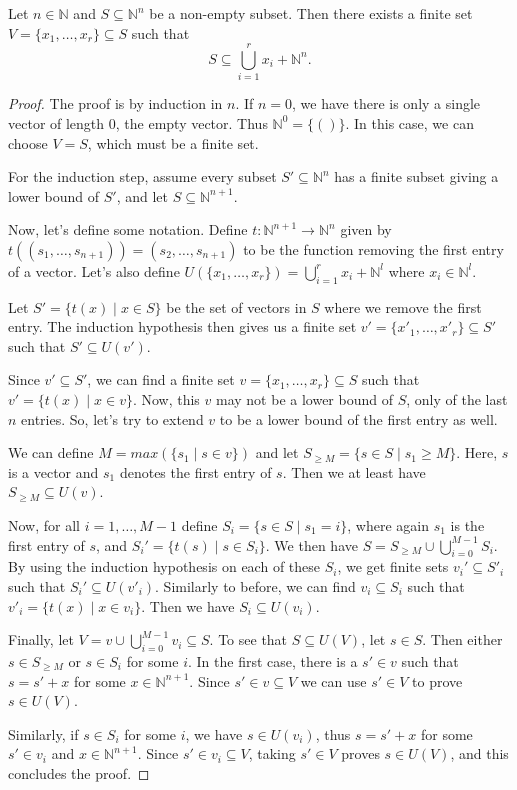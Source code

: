 \documentclass[a4paper, 12pt]{article}
\newcommand{\N}{\mathbb{N}}
\theoremstyle{changedot}
\theoremstyle{changedotbreak}
\theoremstyle{nonumberplain}
\newtheorem{proof}{Proof}
\begin{document}
\begin{lemma}\label{lem:dickson}
Let $n \in \N$ and $S \subseteq \N^{n}$ be a non-empty subset. Then there exists a finite set $V = \{x_{1}, \dots, x_{r}\} \subseteq S$ such that \[S \subseteq \bigcup_{i=1}^{r} x_{i} + \N^{n}.\]
\end{lemma}
\begin{proof}
  The proof is by induction in $n$. If $n = 0$, we have there is only a single vector of length 0, the empty vector. Thus $\N^{0} = \{()\}$. In this case, we can choose $V = S$, which must be a finite set.

  For the induction step, assume every subset $S' \subseteq \N^{n}$ has a finite subset giving a lower bound of $S'$, and let $S \subseteq \N^{n+1}$.

  Now, let's define some notation. Define $t : \N^{n+1} \to \N^{n}$ given by $t((s_{1}, \dots, s_{n+1})) = (s_{2}, \dots, s_{n+1})$ to be the function removing the first entry of a vector. Let's also define $U(\{x_{1}, \dots, x_{r}\}) = \bigcup_{i=1}^{r} x_{i} + \N^{l}$ where $x_{i} \in \N^{l}$.

  Let $S' = \{t(x) \mid x \in S\}$ be the set of vectors in $S$ where we remove the first entry. The induction hypothesis then gives us a finite set $v' = \{x'_{1}, \dots, x'_{r}\} \subseteq S'$ such that $S' \subseteq U(v')$.

  Since $v' \subseteq S'$, we can find a finite set $v = \{x_{1}, \dots, x_{r}\} \subseteq S$ such that $v' = \{t(x) \mid x \in v\}$. Now, this $v$ may not be a lower bound of $S$, only of the last $n$ entries. So, let's try to extend $v$ to be a lower bound of the first entry as well.

  We can define $M = max(\{s_{1} \mid s \in v\})$ and let $S_{\ge M} = \{s \in S \mid s_{1} \ge M\}$. Here, $s$ is a vector and $s_{1}$ denotes the first entry of $s$. Then we at least have $S_{\ge M} \subseteq U(v)$.

  Now, for all $i = 1, \dots, M-1$ define $S_{i} = \{s \in S \mid s_{1} = i\}$, where again $s_{1}$ is the first entry of $s$, and $S_{i}' = \{t(s) \mid s \in S_{i}\}$. We then have $S = S_{\ge M} \cup \bigcup_{i=0}^{M-1} S_{i}$. By using the induction hypothesis on each of these $S_{i}$, we get finite sets $v_{i}' \subseteq S'_{i}$ such that $S_{i}' \subseteq U(v'_{i})$. Similarly to before, we can find $v_{i} \subseteq S_{i}$ such that $v'_{i} = \{t(x) \mid x \in v_{i}\}$. Then we have $S_{i} \subseteq U(v_{i})$.

  Finally, let $V = v \cup \bigcup_{i=0}^{M-1}v_{i} \subseteq S$. To see that $S \subseteq U(V)$, let $s \in S$. Then either $s \in S_{\ge M}$ or $s \in S_{i}$ for some $i$. In the first case, there is a $s' \in v$ such that $s = s' + x$ for some $x \in \N^{n+1}$. Since $s' \in v \subseteq V$ we can use $s' \in V$ to prove $s \in U(V)$.

  Similarly, if $s \in S_{i}$ for some $i$, we have $s \in U(v_{i})$, thus $s = s' + x$ for some $s' \in v_{i}$ and $x \in \N^{n+1}$. Since $s' \in v_{i} \subseteq V$, taking $s' \in V$ proves $s \in U(V)$, and this concludes the proof.
\end{proof}
\end{document}
